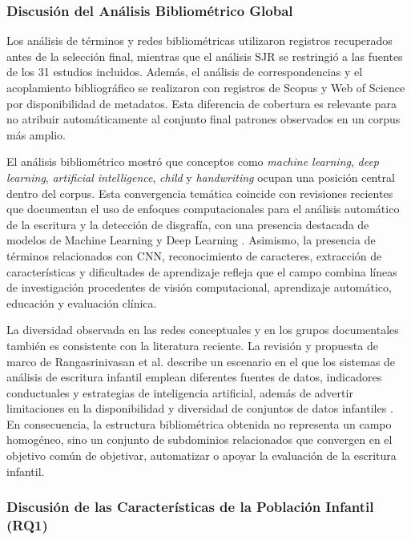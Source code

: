\documentclass{iaesarticle}
\begin{document}
\subsubsection{Discusión del Análisis Bibliométrico Global}

Los análisis de términos y redes bibliométricas utilizaron registros recuperados
antes de la selección final, mientras que el análisis SJR se restringió a las
fuentes de los 31 estudios incluidos. Además, el análisis de correspondencias y
el acoplamiento bibliográfico se realizaron con registros de Scopus y Web of
Science por disponibilidad de metadatos. Esta diferencia de cobertura es
relevante para no atribuir automáticamente al conjunto final patrones
observados en un corpus más amplio.

El análisis bibliométrico mostró que conceptos como \textit{machine learning},
\textit{deep learning}, \textit{artificial intelligence}, \textit{child} y
\textit{handwriting} ocupan una posición central dentro del corpus. Esta
convergencia temática coincide con revisiones recientes que documentan el uso
de enfoques computacionales para el análisis automático de la escritura y la
detección de disgrafía, con una presencia destacada de modelos de Machine
Learning y Deep Learning \cite{Kunhoth2024,Fallah2025}. Asimismo, la presencia de términos
relacionados con CNN, reconocimiento de caracteres, extracción de
características y dificultades de aprendizaje refleja que el campo combina
líneas de investigación procedentes de visión computacional, aprendizaje
automático, educación y evaluación clínica.

La diversidad observada en las redes conceptuales y en los grupos documentales
también es consistente con la literatura reciente. La revisión y propuesta de marco de Rangasrinivasan et al. describe un
escenario en el que los sistemas de análisis de escritura infantil emplean
diferentes fuentes de datos, indicadores conductuales y estrategias de
inteligencia artificial, además de advertir limitaciones en la disponibilidad
y diversidad de conjuntos de datos infantiles \cite{Rangasrinivasan2025}. En consecuencia, la estructura
bibliométrica obtenida no representa un campo homogéneo, sino un conjunto de
subdominios relacionados que convergen en el objetivo común de objetivar,
automatizar o apoyar la evaluación de la escritura infantil.

\subsubsection{Discusión de las Características de la Población Infantil (RQ1)}
\end{document}
